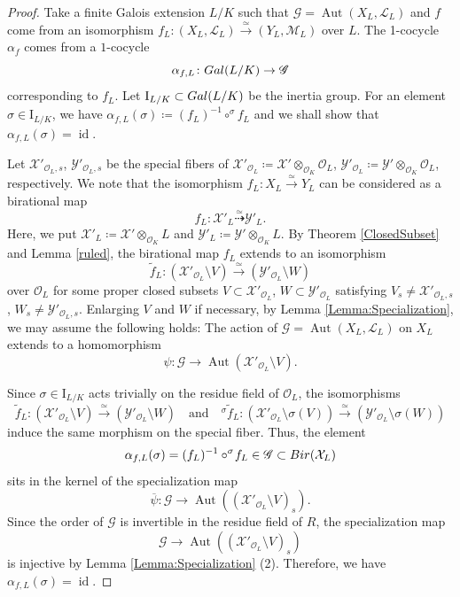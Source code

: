 \documentclass[10pt,a4paper]{amsart}
\DeclareMathOperator{\Aut}{Aut}
\newcommand{\Bir}{{\rm Bir}}
\newcommand{\Gal}{{\rm Gal}}
\DeclareMathOperator{\id}{id}
\newcommand\rI{\mathrm{I}}
\begin{document}
\begin{proof}
Take a finite Galois extension $L/K$ such that
$\mathscr{G} = \Aut(X_{L}, \mathscr{L}_{L})$ and 
$f$ come from an isomorphism
$f_L \colon (X_L, \mathscr{L}_{L})
\overset{\simeq}{\to}
(Y_L, \mathscr{M}_{L})$ over $L$.
The 1-cocycle  $\alpha_f$ comes from a $1$-cocycle
$$\alpha_{f,L} \colon \Gal(L/K) \to \mathscr{G}$$
corresponding to $f_L$.
Let $\rI_{L/K} \subset \Gal(L/K)$ be the inertia group.
For an element $\sigma \in \rI_{L/K}$, we have
$\alpha_{f,L}(\sigma) \coloneqq (f_L)^{-1} \circ ^{\sigma} \!f_L$ 
and 
we shall show that $\alpha_{f,L}(\sigma) = \id$.

Let $\mathcal{X}'_{\mathscr{O}_L,s}$, $\mathcal{Y}'_{\mathscr{O}_L,s}$
be the special fibers of
$\mathcal{X}'_{\mathscr{O}_L} \coloneqq \mathcal{X}' \otimes_{\mathscr{O}_K} \mathscr{O}_L$,
$\mathcal{Y}'_{\mathscr{O}_L} \coloneqq \mathcal{Y}' \otimes_{\mathscr{O}_K} \mathscr{O}_L$,
respectively.
We note that the isomorphism $f_L \colon X_L \overset{\simeq}{\to} Y_L$
can be considered as a birational map
\[f_L \colon \mathcal{X}'_{L} \overset{\simeq}{\dashrightarrow} \mathcal{Y}'_{L}.\]
Here, we put $\mathcal{X}'_{L} \coloneqq \mathcal{X}' \otimes_{\mathscr{O}_K} L$ and
$\mathcal{Y}'_{L} \coloneqq \mathcal{Y}' \otimes_{\mathscr{O}_K} L$. By Theorem \ref{ClosedSubset} and Lemma \ref{ruled},
the birational map $f_L$
extends to an isomorphism
\[
  \widetilde{f}_L \colon
  (\mathcal{X}'_{\mathscr{O}_L} \setminus V) \overset{\simeq}{\to}
  (\mathcal{Y}'_{\mathscr{O}_L} \setminus W)
\]
over $\mathscr{O}_L$
for some proper closed subsets
$V \subset \mathcal{X}'_{\mathscr{O}_L}$, $W \subset \mathcal{Y}'_{\mathscr{O}_L}$
satisfying
$V_s \neq \mathcal{X}'_{\mathscr{O}_L,s}$, $W_s \neq \mathcal{Y}'_{\mathscr{O}_L,s}$.
Enlarging $V$ and $W$ if necessary, by Lemma \ref{Lemma:Specialization},
we may assume the following holds:
The action of
$\mathscr{G} = \Aut(X_{L}, \mathscr{L}_{L})$ on $X_L$
extends to a homomorphism
\[
  \psi \colon \mathscr{G} \to \Aut(\mathcal{X}'_{\mathscr{O}_L} \setminus V).
\]

Since $\sigma \in \rI_{L/K}$ acts trivially on the residue field of $\mathscr{O}_L$,
the isomorphisms
\[
  \widetilde{f}_L \colon
  (\mathcal{X}'_{\mathscr{O}_L} \setminus V) \overset{\simeq}{\to}
  (\mathcal{Y}'_{\mathscr{O}_L} \setminus W)
  \quad \text{and} \quad
  ^{\sigma} \!\widetilde{f}_L \colon
  (\mathcal{X}'_{\mathscr{O}_L} \setminus \sigma(V)) \overset{\simeq}{\to}
  (\mathcal{Y}'_{\mathscr{O}_L} \setminus \sigma(W))
\]
induce the same morphism on the special fiber.
Thus, the element
\[
 \alpha_{f,L}(\sigma) = (f_L)^{-1} \circ ^{\sigma}\!f_L \in \mathscr{G} \subset \Bir (\mathcal{X}_{L})
 \]
sits in the kernel of the specialization map
\[
  \overline{\psi} \colon \mathscr{G} \to \Aut((\mathcal{X}'_{\mathscr{O}_L} \setminus V)_s).
\]
Since the order of $\mathscr{G}$ is invertible
in the residue field of $R$,
the specialization map
$$\mathscr{G} \to \Aut((\mathcal{X}'_{\mathscr{O}_{L}} \setminus V)_{s})$$
is injective by Lemma \ref{Lemma:Specialization} (2).
Therefore,  we have $\alpha_{f,L}(\sigma) = \id$.
\end{proof}
\end{document}
